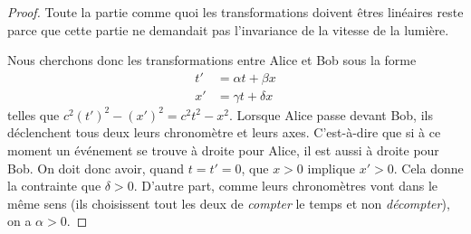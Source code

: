\begin{proof}
	Toute la partie comme quoi les transformations doivent êtres linéaires reste parce que cette partie ne demandait pas l'invariance de la vitesse de la lumière.

	Nous cherchons donc les transformations entre Alice et Bob sous la forme
	\[
		\begin{split}
			t'&=\alpha t+\beta x\\
			x'&=\gamma t+\delta x
		\end{split}
	\]
	telles que \( c^2(t')^2-(x')^2=c^2t^2-x^2\). Lorsque Alice passe devant Bob, ils déclenchent tous deux leurs chronomètre et leurs axes. C'est-à-dire que si à ce moment un événement se trouve à droite pour Alice, il est aussi à droite pour Bob. On doit donc avoir, quand \( t=t'=0\), que \( x>0\) implique \( x'>0\). Cela donne la contrainte que \( \delta>0\). D'autre part, comme leurs chronomètres vont dans le même sens (ils choisissent tout les deux de \emph{compter} le temps et non \emph{décompter}), on a \( \alpha>0\).


\end{proof}

